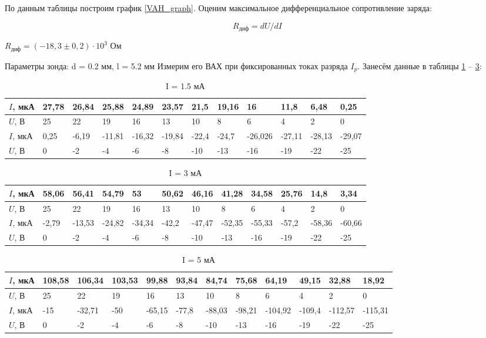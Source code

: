 \documentclass[a4paper, 12pt]{article}
\begin{document}
По данным таблицы построим график \ref{VAH_graph}.
Оценим максимальное дифференциальное сопротивление заряда:

\[R_\text{диф} = dU/dI\]

$R_\text{диф} = (-18,3 \pm 0,2)\cdot10^3$ Ом

Параметры зонда: d = 0.2 мм, l = 5.2 мм
Измерим его ВАХ при фиксированных токах разряда $I_p$. Занесём данные в таблицы \ref{Zond1} -- \ref{Zond3}:

\begin{table}[h]
\caption{I = 1.5 мА}
\small
\begin{tabular}{|l|l|l|l|l|l|l|l|l|l|l|l|}
\hline
$I$, мкА & 27,78 & 26,84 & 25,88  & 24,89  & 23,57  & 21,5  & 19,16 & 16      & 11,8   & 6,48   & 0,25   \\ \hline
$U$, В   & 25    & 22    & 19     & 16     & 13     & 10    & 8     & 6       & 4      & 2      & 0      \\ \hline
$I$, мкА & 0,25  & -6,19 & -11,81 & -16,32 & -19,84 & -22,4 & -24,7 & -26,026 & -27,11 & -28,13 & -29,07 \\ \hline
$U$, В   & 0     & -2    & -4     & -6     & -8     & -10   & -13   & -16     & -19    & -22    & -25    \\ \hline
\end{tabular}
\label{Zond1}
\end{table}

\begin{table}[h]
\caption{I = 3 мА}
\small
\begin{tabular}{|l|l|l|l|l|l|l|l|l|l|l|l|}
\hline
$I$, мкА & 58,06 & 56,41  & 54,79  & 53     & 50,62 & 46,16  & 41,28  & 34,58  & 25,76 & 14,8   & 3,34   \\ \hline
$U$, В   & 25    & 22     & 19     & 16     & 13    & 10     & 8      & 6      & 4     & 2      & 0      \\ \hline
$I$, мкА & -2,79 & -13,53 & -24,82 & -34,34 & -42,2 & -47,47 & -52,35 & -55,33 & -57,2 & -58,36 & -60,66 \\ \hline
$U$, В   & 0     & -2     & -4     & -6     & -8    & -10    & -13    & -16    & -19   & -22    & -25    \\ \hline
\end{tabular}
\label{Zond2}
\end{table}

\begin{table}[h!]
\caption{I = 5 мА}
\footnotesize
\begin{tabular}{|l|l|l|l|l|l|l|l|l|l|l|l|}
\hline
$I$, мкА & 108,58 & 106,34 & 103,53 & 99,88  & 93,84 & 84,74  & 75,68  & 64,19   & 49,15  & 32,88   & 18,92   \\ \hline
$U$, В   & 25     & 22     & 19     & 16     & 13    & 10     & 8      & 6       & 4      & 2       & 0       \\ \hline
$I$, мкА & -15    & -32,71 & -50    & -65,15 & -77,8 & -88,03 & -98,21 & -104,92 & -109,4 & -112,57 & -115,31 \\ \hline
$U$, В   & 0      & -2     & -4     & -6     & -8    & -10    & -13    & -16     & -19    & -22     & -25     \\ \hline
\end{tabular}
\label{Zond3}
\end{table}
\end{document}

